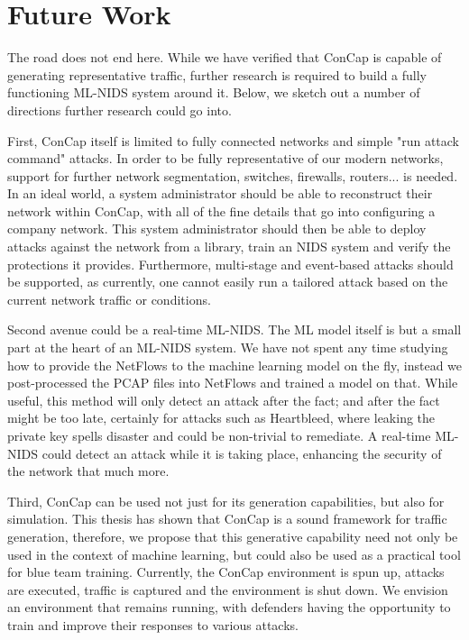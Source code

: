 \section{Future Work}\label{future_work}

The road does not end here. While we have verified that ConCap is capable of generating representative traffic, further research is required to build a fully functioning ML-NIDS system around it. Below, we sketch out a number of directions further research could go into.

First, ConCap itself is limited to fully connected networks and simple "run attack command" attacks. In order to be fully representative of our modern networks, support for further network segmentation, switches, firewalls, routers... is needed. In an ideal world, a system administrator should be able to reconstruct their network within ConCap, with all of the fine details that go into configuring a company network. This system administrator should then be able to deploy attacks against the network from a library, train an NIDS system and verify the protections it provides. Furthermore, multi-stage and event-based attacks should be supported, as currently, one cannot easily run a tailored attack based on the current network traffic or conditions.

Second avenue could be a real-time ML-NIDS. The ML model itself is but a small part at the heart of an ML-NIDS system. We have not spent any time studying how to provide the NetFlows to the machine learning model on the fly, instead we post-processed the PCAP files into NetFlows and trained a model on that. While useful, this method will only detect an attack after the fact; and after the fact might be too late, certainly for attacks such as Heartbleed, where leaking the private key spells disaster and could be non-trivial to remediate. A real-time ML-NIDS could detect an attack while it is taking place, enhancing the security of the network that much more.

Third, ConCap can be used not just for its generation capabilities, but also for simulation. This thesis has shown that ConCap is a sound framework for traffic generation, therefore, we propose that this generative capability need not only be used in the context of machine learning, but could also be used as a practical tool for blue team training. Currently, the ConCap environment is spun up, attacks are executed, traffic is captured and the environment is shut down. We envision an environment that remains running, with defenders having the opportunity to train and improve their responses to various attacks.
